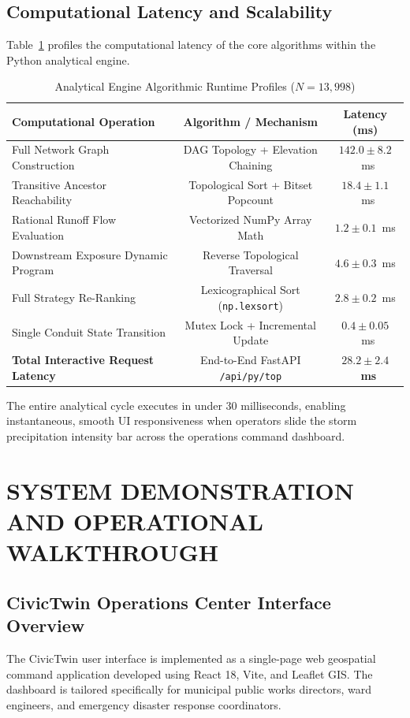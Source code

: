 \documentclass[12pt,a4paper]{report}
\begin{document}
\section{Computational Latency and Scalability}
Table~\ref{tab:runtime_scalability} profiles the computational latency of the core algorithms within the Python analytical engine.

\begin{table}[h!]
\centering
\caption{Analytical Engine Algorithmic Runtime Profiles ($N = 13{,}998$)}
\label{tab:runtime_scalability}
\begin{tabular}{|l|c|c|}
\hline
\textbf{Computational Operation} & \textbf{Algorithm / Mechanism} & \textbf{Latency (ms)} \\
\hline
Full Network Graph Construction & DAG Topology + Elevation Chaining & $142.0 \pm 8.2$~ms \\
Transitive Ancestor Reachability & Topological Sort + Bitset Popcount & $18.4 \pm 1.1$~ms \\
Rational Runoff Flow Evaluation & Vectorized NumPy Array Math & $1.2 \pm 0.1$~ms \\
Downstream Exposure Dynamic Program & Reverse Topological Traversal & $4.6 \pm 0.3$~ms \\
Full Strategy Re-Ranking & Lexicographical Sort (\texttt{np.lexsort}) & $2.8 \pm 0.2$~ms \\
Single Conduit State Transition & Mutex Lock + Incremental Update & $0.4 \pm 0.05$~ms \\
\hline
\textbf{Total Interactive Request Latency} & End-to-End FastAPI \texttt{/api/py/top} & \textbf{$28.2 \pm 2.4$~ms} \\
\hline
\end{tabular}
\end{table}

The entire analytical cycle executes in under 30 milliseconds, enabling instantaneous, smooth UI responsiveness when operators slide the storm precipitation intensity bar across the operations command dashboard.


\chapter{SYSTEM DEMONSTRATION AND OPERATIONAL WALKTHROUGH}

\section{CivicTwin Operations Center Interface Overview}
The CivicTwin user interface is implemented as a single-page web geospatial command application developed using React 18, Vite, and Leaflet GIS. The dashboard is tailored specifically for municipal public works directors, ward engineers, and emergency disaster response coordinators.
\end{document}
